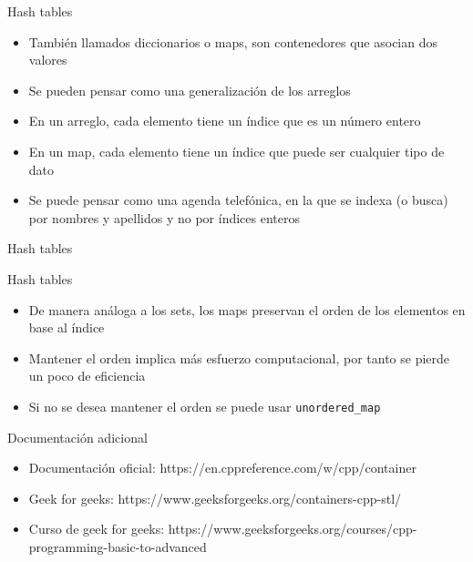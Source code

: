 \documentclass[]{beamer}
\begin{document}
\begin{frame}{Hash tables}
  \begin{itemize}
    \item Tambi\'en llamados diccionarios o maps, son contenedores que asocian dos valores
      \pause
    \item Se pueden pensar como una generalizaci\'on de los arreglos
      \pause
    \item En un arreglo, cada elemento tiene un \'indice que es un n\'umero entero
      \pause
    \item En un map, cada elemento tiene un \'indice que puede ser cualquier tipo de dato
      \pause
    \item Se puede pensar como una agenda telef\'onica, en la que se indexa (o busca) por nombres y apellidos y no por \'indices enteros
      \pause
  \end{itemize}
\end{frame}

\begin{frame}{Hash tables}
  
\end{frame}

\begin{frame}{Hash tables}
  \begin{itemize}
    \item De manera an\'aloga a los sets, los maps preservan el orden de los elementos en base al \'indice
      \pause
    \item Mantener el orden implica m\'as esfuerzo computacional, por tanto se pierde un poco de eficiencia
      \pause
    \item Si no se desea mantener el orden se puede usar \texttt{unordered\_map}
  \end{itemize}
\end{frame}

\begin{frame}{Documentaci\'on adicional}
  \begin{itemize}
    \item Documentaci\'on oficial: https://en.cppreference.com/w/cpp/container
    \item Geek for geeks: https://www.geeksforgeeks.org/containers-cpp-stl/
    \item Curso de geek for geeks: https://www.geeksforgeeks.org/courses/cpp-programming-basic-to-advanced
  \end{itemize}
\end{frame}
\end{document}
